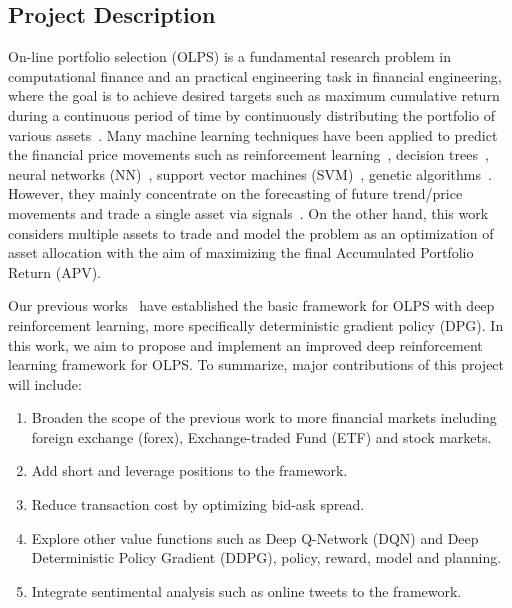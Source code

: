 \subsection{Project Description}
On-line portfolio selection (OLPS) is a fundamental research problem in computational finance and an practical engineering task in financial engineering, where the goal is to achieve desired targets such as maximum cumulative return during a continuous period of time by continuously distributing the portfolio of various assets~\cite{li2014online}. Many machine learning techniques have been applied to predict the financial price movements such as reinforcement learning~\cite{moody1998performance, moody2001drl}, decision trees~\cite{tsang2004eddie}, neural networks (NN)~\cite{kimoto1990stock}, support vector machines (SVM)~\cite{tay2002modified}, genetic algorithms~\cite{mahfoud1996financial}. However, they mainly concentrate on the forecasting of future trend/price movements and trade a single asset via signals~\cite{borodin2000competitive}. On the other hand, this work considers multiple assets to trade and model the problem as an optimization of asset allocation with the aim of maximizing the final Accumulated Portfolio Return (APV).


Our previous works~\cite{jiang2017cryptocurrency, jiang2017deep} have established the basic framework for OLPS with deep reinforcement learning, more specifically deterministic gradient policy (DPG). In this work, we aim to propose and implement an improved deep reinforcement learning framework for OLPS. To summarize, major contributions of this project will include: 
\begin{enumerate}
    \item Broaden the scope of the previous work to more financial markets including foreign exchange (forex), Exchange-traded Fund (ETF) and stock markets.
    \item Add short and leverage positions to the framework.
    \item Reduce transaction cost by optimizing bid-ask spread.
    \item Explore other value functions such as Deep Q-Network (DQN) and Deep Deterministic Policy Gradient (DDPG), policy, reward, model and planning.
    \item Integrate sentimental analysis such as online tweets to the framework.
\end{enumerate}

